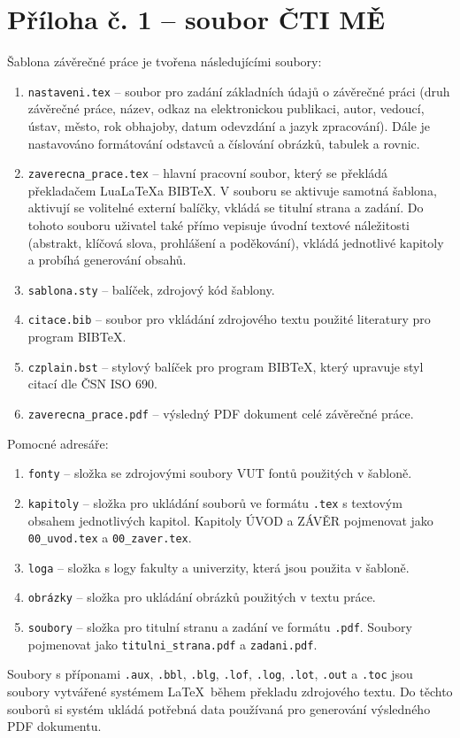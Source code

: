 \chapter{Příloha č. 1 -- soubor ČTI MĚ}
Šablona závěrečné práce je tvořena následujícími soubory:

\begin{enumerate}
	\item \verb|nastaveni.tex| -- soubor pro zadání základních údajů o závěrečné práci (druh závěrečné práce, název, odkaz na elektronickou publikaci, autor, vedoucí, ústav, město, rok obhajoby, datum odevzdání a jazyk zpracování). Dále je nastavováno formátování odstavců a číslování obrázků, tabulek a rovnic.
	\item \verb|zaverecna_prace.tex| -- hlavní pracovní soubor, který se překládá překladačem Lua\LaTeX a BIB\TeX. V souboru se aktivuje samotná šablona, aktivují se volitelné externí balíčky, vkládá se titulní strana a zadání. Do tohoto souboru uživatel také přímo vepisuje úvodní textové náležitosti (abstrakt, klíčová slova, prohlášení a poděkování), vkládá jednotlivé kapitoly a probíhá generování obsahů.
	\item \verb|sablona.sty| -- balíček, zdrojový kód šablony.
	\item \verb|citace.bib| -- soubor pro vkládání zdrojového textu použité literatury pro program BIB\TeX.
	\item \verb|czplain.bst| -- stylový balíček pro program BIB\TeX, který upravuje styl citací dle ČSN ISO 690.
	\item \verb|zaverecna_prace.pdf| -- výsledný PDF dokument celé závěrečné práce.	
\end{enumerate}

Pomocné adresáře:

\begin{enumerate}
	\item \verb|fonty| -- složka se zdrojovými soubory VUT fontů použitých v šabloně.
	\item \verb|kapitoly| -- složka pro ukládání souborů ve formátu \verb|.tex| s textovým obsahem jednotlivých kapitol. Kapitoly ÚVOD a ZÁVĚR pojmenovat jako \verb|00_uvod.tex| a \verb|00_zaver.tex|.
	\item \verb|loga| -- složka s logy fakulty a univerzity, která jsou použita v šabloně.
	\item \verb|obrázky| -- složka pro ukládání obrázků použitých v textu práce.
	\item \verb|soubory| -- složka pro titulní stranu a zadání ve formátu \verb|.pdf|. Soubory pojmenovat jako \verb|titulni_strana.pdf| a \verb|zadani.pdf|.
\end{enumerate}

Soubory s příponami \verb|.aux|, \verb|.bbl|, \verb|.blg|, \verb|.lof|, \verb|.log|, \verb|.lot|, \verb|.out| a \verb|.toc| jsou soubory vytvářené systémem \LaTeX\ během překladu zdrojového textu. Do těchto souborů si systém ukládá potřebná data používaná pro generování výsledného PDF dokumentu.